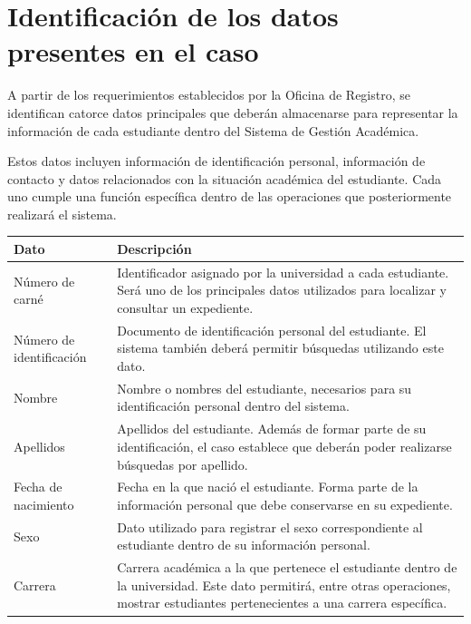 \section{Identificación de los datos presentes en el caso}

A partir de los requerimientos establecidos por la Oficina de Registro,
se identifican catorce datos principales que deberán almacenarse para
representar la información de cada estudiante dentro del Sistema de
Gestión Académica.

Estos datos incluyen información de identificación personal, información
de contacto y datos relacionados con la situación académica del
estudiante. Cada uno cumple una función específica dentro de las
operaciones que posteriormente realizará el sistema.

\begin{longtable}{p{4cm} p{10cm}}
\toprule
Dato & Descripción \\
\midrule
\endhead

Número de carné &
Identificador asignado por la universidad a cada estudiante. Será uno de
los principales datos utilizados para localizar y consultar un
expediente. \\

Número de identificación &
Documento de identificación personal del estudiante. El sistema también
deberá permitir búsquedas utilizando este dato. \\

Nombre &
Nombre o nombres del estudiante, necesarios para su identificación
personal dentro del sistema. \\

Apellidos &
Apellidos del estudiante. Además de formar parte de su identificación,
el caso establece que deberán poder realizarse búsquedas por apellido. \\

Fecha de nacimiento &
Fecha en la que nació el estudiante. Forma parte de la información
personal que debe conservarse en su expediente. \\

Sexo &
Dato utilizado para registrar el sexo correspondiente al estudiante
dentro de su información personal. \\

Carrera &
Carrera académica a la que pertenece el estudiante dentro de la
universidad. Este dato permitirá, entre otras operaciones, mostrar
estudiantes pertenecientes a una carrera específica. \\


\end{longtable}
